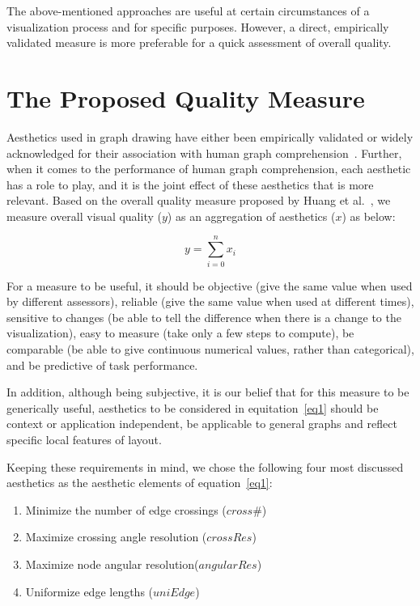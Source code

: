 \documentclass[conference,letterpaper]{IEEEtran}
\begin{document}
The above-mentioned approaches are useful at certain circumstances of a visualization process and for specific purposes. However, a direct, empirically validated measure is more preferable for a quick assessment of overall quality.    


\section{The Proposed Quality Measure}

Aesthetics used in graph drawing have either been empirically validated or widely acknowledged for their association with human graph comprehension~\cite{purchase95,di}. Further, when it comes to the performance of human graph comprehension, each aesthetic has a role to play, and it is the joint effect of these aesthetics that is more relevant. Based on the overall quality measure proposed by Huang et al.~\cite{huang12}, we measure overall visual quality ($y$) as an aggregation of aesthetics ($x$) as below:

\begin{equation}
\label{eq1}
y = \sum\limits_{i=0}^{n} x_{i}
\end{equation}

For a measure to be useful, it should be objective (give the same value when used by different assessors), reliable (give the same value when used at different times), sensitive to changes (be able to tell the difference when there is a change to the visualization), easy to measure (take only a few steps to compute), be comparable (be able to give continuous numerical values, rather than categorical), and be predictive of task performance.



In addition, although being subjective, it is our belief that for this measure to be generically useful, aesthetics to be considered in equitation~\ref{eq1} should be context or application independent, be applicable to general graphs and reflect specific local features of layout.

Keeping these requirements in mind, we chose the following four most discussed aesthetics as the aesthetic elements of equation~\ref{eq1}:

\begin{enumerate}
\item{Minimize the number of edge crossings ($cross\#$)}
\item{Maximize crossing angle resolution ($crossRes$)}
\item{Maximize node angular resolution($angularRes$)}
\item{Uniformize edge lengths ($uniEdge$)}


\end{enumerate}
\end{document}
